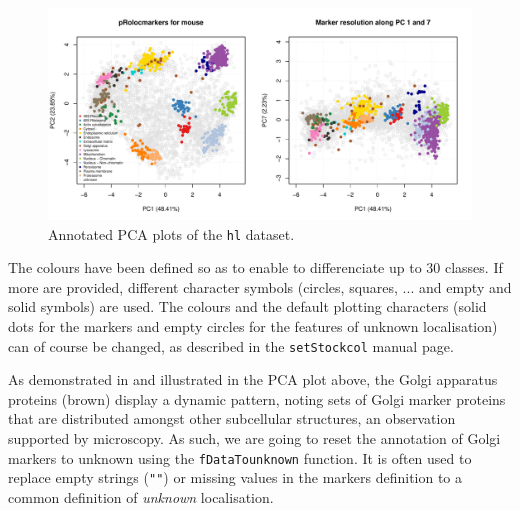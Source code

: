 \begin{figure}[!ht]
  \centering
\begin{knitrout}
\color{fgcolor}\begin{kframe}
\begin{alltt}
\hlstd{(} \hlstd{=} \hlstd{(}\hlstd{,} \hlstd{))}
  \hlstd{=} \hlstd{)}
  \hlstd{=} \hlstd{)}
  \hlstd{=} \hlstd{(}\hlstd{,} \hlstd{),}  \hlstd{=} \hlstd{)}
\end{alltt}
\end{kframe}
\includegraphics[width=\textwidth]{figure/plotmarkers-1} 

\end{knitrout}
  \caption{Annotated PCA plots of the \texttt{hl} dataset.}
  \label{fig:plotmarkers}
\end{figure}


The colours have been defined so as to enable to differenciate up to
30 classes. If more are provided, different character symbols
(circles, squares, ... and empty and solid symbols) are used. The
colours and the default plotting characters (solid dots for the
markers and empty circles for the features of unknown localisation)
can of course be changed, as described in the \texttt{setStockcol} manual
page.

As demonstrated in \cite{hyper} and illustrated in the PCA plot above,
the Golgi apparatus proteins (brown) display a dynamic pattern, noting
sets of Golgi marker proteins that are distributed amongst other
subcellular structures, an observation supported by microscopy. As
such, we are going to reset the annotation of Golgi markers to unknown
using the \texttt{fDataTounknown} function. It is often used to
replace empty strings (\texttt{""}) or missing values in the markers definition
to a common definition of \textit{unknown} localisation.

